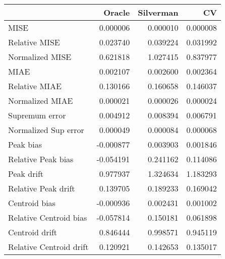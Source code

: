 \begin{tabular}{lrrr}
  \toprule
 & Oracle & Silverman & CV \\ 
  \midrule
MISE & 0.000006 & 0.000010 & 0.000008 \\ 
  Relative MISE & 0.023740 & 0.039224 & 0.031992 \\ 
  Normalized MISE & 0.621818 & 1.027415 & 0.837977 \\ 
  MIAE & 0.002107 & 0.002600 & 0.002364 \\ 
  Relative MIAE & 0.130166 & 0.160658 & 0.146037 \\ 
  Normalized MIAE & 0.000021 & 0.000026 & 0.000024 \\ 
  Supremum error & 0.004912 & 0.008394 & 0.006791 \\ 
  Normalized Sup error & 0.000049 & 0.000084 & 0.000068 \\ 
  Peak bias & -0.000877 & 0.003903 & 0.001846 \\ 
  Relative Peak bias & -0.054191 & 0.241162 & 0.114086 \\ 
  Peak drift & 0.977937 & 1.324634 & 1.183293 \\ 
  Relative Peak drift & 0.139705 & 0.189233 & 0.169042 \\ 
  Centroid bias & -0.000936 & 0.002431 & 0.001002 \\ 
  Relative Centroid bias & -0.057814 & 0.150181 & 0.061898 \\ 
  Centroid drift & 0.846444 & 0.998571 & 0.945119 \\ 
  Relative Centroid drift & 0.120921 & 0.142653 & 0.135017 \\ 
   \bottomrule
\end{tabular}
